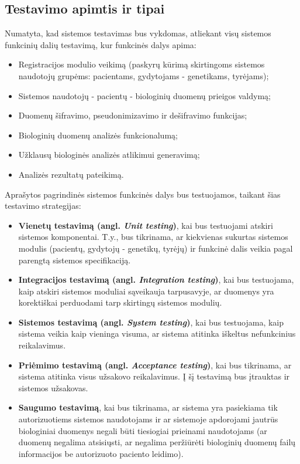 \documentclass[12pt]{article}
\begin{document}
\subsection{Testavimo apimtis ir tipai}
\label{sec:SCOPE}
Numatyta, kad sistemos testavimas bus vykdomas, atliekant visų sistemos
funkcinių dalių testavimą, kur funkcinės dalys apima:
\begin{itemize}
    \item Registracijos modulio veikimą (paskyrų kūrimą skirtingoms sistemos
    naudotojų grupėms: pacientams, gydytojams - genetikams, tyrėjams);
    \item Sistemos naudotojų - pacientų - biologinių duomenų prieigos valdymą;
    \item Duomenų šifravimo, pseudonimizavimo ir dešifravimo funkcijas;
    \item Biologinių duomenų analizės funkcionalumą;
    \item Užklausų biologinės analizės atlikimui generavimą;
    \item Analizės rezultatų pateikimą.
\end{itemize}

Aprašytos pagrindinės sistemos funkcinės dalys bus testuojamos, taikant šias
testavimo strategijas:
\begin{itemize}
    \item \textbf{Vienetų testavimą (angl. \emph{Unit testing})}, kai bus
    testuojami atskiri sistemos komponentai. T.y., bus tikrinama, ar kiekvienas
    sukurtas sistemos modulis (pacientų, gydytojų - genetikų, tyrėjų) ir
    funkcinė dalis veikia pagal parengtą sistemos specifikaciją.
    \item \textbf{Integracijos testavimą (angl. \emph{Integration testing})},
    kai bus testuojama, kaip atskiri sistemos moduliai sąveikauja tarpusavyje,
    ar duomenys yra korektiškai perduodami tarp skirtingų sistemos modulių.
    \item \textbf{Sistemos testavimą (angl. \emph{System testing})}, kai bus
    testuojama, kaip sistema veikia kaip vieninga visuma, ar sistema atitinka
    iškeltus nefunkcinius reikalavimus.
    \item \textbf{Priėmimo testavimą (angl. \emph{Acceptance testing})}, kai bus
    tikrinama, ar sistema atitinka visus užsakovo reikalavimus. Į šį testavimą
    bus įtrauktas ir sistemos užsakovas.
    \item \textbf{Saugumo testavimą}, kai bus tikrinama, ar sistema yra
    pasiekiama tik autorizuotiems sistemos naudotojams ir ar sistemoje
    apdorojami jautrūs biologiniai duomenys negali būti tiesiogiai prieinami
    naudotojams (ar duomenų negalima atsisiųsti, ar negalima peržiūrėti
    biologinių duomenų failų informacijos be autorizuoto paciento leidimo).
\end{itemize}
\end{document}
